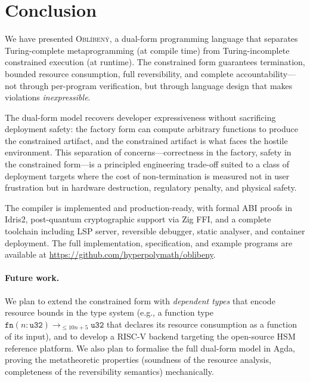 \documentclass[11pt,a4paper]{article}
\newcommand{\obl}{\textsc{Obl\'{i}ben\'{y}}}
\begin{document}
\section{Conclusion}
\label{sec:conclusion}

We have presented \obl{}, a dual-form programming language that separates
Turing-complete metaprogramming (at compile time) from Turing-incomplete
constrained execution (at runtime).  The constrained form guarantees
termination, bounded resource consumption, full reversibility, and complete
accountability---not through per-program verification, but through language
design that makes violations \emph{inexpressible}.

The dual-form model recovers developer expressiveness without sacrificing
deployment safety: the factory form can compute arbitrary functions to produce
the constrained artifact, and the constrained artifact is what faces the
hostile environment.  This separation of concerns---correctness in the
factory, safety in the constrained form---is a principled engineering
trade-off suited to a class of deployment targets where the cost of
non-termination is measured not in user frustration but in hardware
destruction, regulatory penalty, and physical safety.

The compiler is implemented and production-ready, with formal ABI proofs in
Idris2, post-quantum cryptographic support via Zig FFI, and a complete
toolchain including LSP server, reversible debugger, static analyser, and
container deployment.  The full implementation, specification, and example
programs are available at
\url{https://github.com/hyperpolymath/oblibeny}.

\paragraph{Future work.}
We plan to extend the constrained form with \emph{dependent types} that
encode resource bounds in the type system (e.g., a function type
$\texttt{fn}(n : \texttt{u32}) \to_{\leq 10n + 5} \texttt{u32}$ that
declares its resource consumption as a function of its input), and to develop
a RISC-V backend targeting the open-source HSM reference platform.  We also
plan to formalise the full dual-form model in Agda, proving the metatheoretic
properties (soundness of the resource analysis, completeness of the
reversibility semantics) mechanically.


\end{document}
